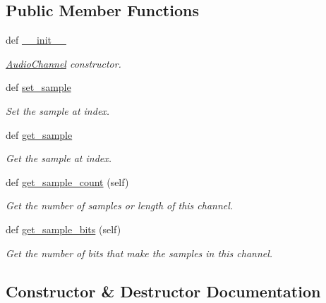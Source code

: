 \subsection*{Public Member Functions}
\begin{DoxyCompactItemize}
\item 
def \hyperlink{classbridges_1_1audio__channel_1_1_audio_channel_a70152da44f434f0ea87f1756a0a884fb}{\+\_\+\+\_\+init\+\_\+\+\_\+}
\begin{DoxyCompactList}\small\item\em \hyperlink{classbridges_1_1audio__channel_1_1_audio_channel}{Audio\+Channel} constructor. \end{DoxyCompactList}\item 
def \hyperlink{classbridges_1_1audio__channel_1_1_audio_channel_adc84cb1c65d84184353603d9fd051017}{set\+\_\+sample}
\begin{DoxyCompactList}\small\item\em Set the sample at index. \end{DoxyCompactList}\item 
def \hyperlink{classbridges_1_1audio__channel_1_1_audio_channel_a1f695d07aa5c95866036b0a55f88d9ae}{get\+\_\+sample}
\begin{DoxyCompactList}\small\item\em Get the sample at index. \end{DoxyCompactList}\item 
def \hyperlink{classbridges_1_1audio__channel_1_1_audio_channel_a5d4780923b9c11029a1d6847db5480d2}{get\+\_\+sample\+\_\+count} (self)
\begin{DoxyCompactList}\small\item\em Get the number of samples or length of this channel. \end{DoxyCompactList}\item 
def \hyperlink{classbridges_1_1audio__channel_1_1_audio_channel_ae9b2e6e0f5aaebc5adc21815f4fe2f9a}{get\+\_\+sample\+\_\+bits} (self)
\begin{DoxyCompactList}\small\item\em Get the number of bits that make the samples in this channel. \end{DoxyCompactList}\end{DoxyCompactItemize}


\subsection{Constructor \& Destructor Documentation}
\mbox{\label{classbridges_1_1audio__channel_1_1_audio_channel_a70152da44f434f0ea87f1756a0a884fb}} 
